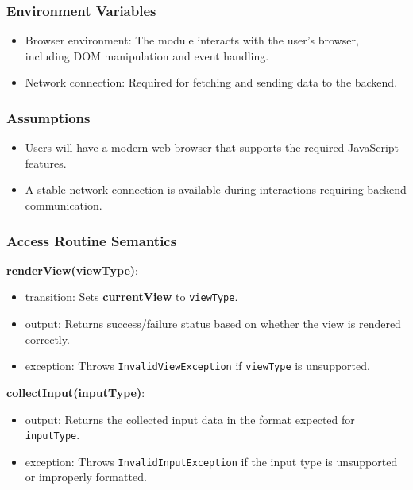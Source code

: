 \documentclass[12pt, titlepage]{article}
\begin{document}
\subsubsection{Environment Variables}

\begin{itemize}
    \item Browser environment: The module interacts with the user's browser, including DOM manipulation and event handling.
    \item Network connection: Required for fetching and sending data to the backend.
\end{itemize}

\subsubsection{Assumptions}

\begin{itemize}
    \item Users will have a modern web browser that supports the required JavaScript features.
    \item A stable network connection is available during interactions requiring backend communication.
\end{itemize}

\subsubsection{Access Routine Semantics}

\noindent \textbf{renderView(viewType)}:
\begin{itemize}
    \item transition: Sets \textbf{currentView} to \texttt{viewType}.
    \item output: Returns success/failure status based on whether the view is rendered correctly.
    \item exception: Throws \texttt{InvalidViewException} if \texttt{viewType} is unsupported.
\end{itemize}

\noindent \textbf{collectInput(inputType)}:
\begin{itemize}
    \item output: Returns the collected input data in the format expected for \texttt{inputType}.
    \item exception: Throws \texttt{InvalidInputException} if the input type is unsupported or improperly formatted.
\end{itemize}
\end{document}
